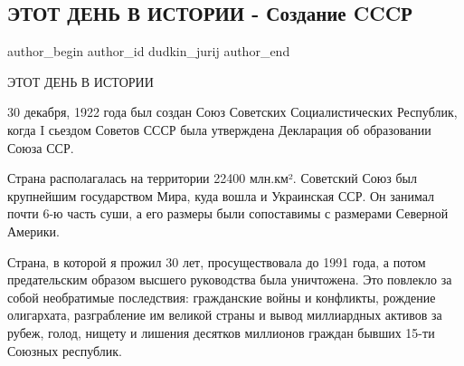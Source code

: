  
 
 
 
 
 
\subsection{ЭТОТ ДЕНЬ В ИСТОРИИ - Создание CCCР}
\label{sec:30_12_2021.fb.dudkin_jurij.1.sozdanie_sssr}
 
\ifcmt
 author_begin
   author_id dudkin_jurij
 author_end
\fi

ЭТОТ ДЕНЬ В ИСТОРИИ

30 декабря, 1922 года был создан Союз Советских Социалистических Республик,
когда I сьездом Советов СССР была утверждена Декларация об образовании Союза
ССР.


Страна располагалась на территории 22400 млн.км². Советский Союз был крупнейшим
государством Мира, куда вошла и Украинская ССР. Он занимал почти 6-ю часть
суши, а его размеры были сопоставимы с размерами Северной Америки.

Страна, в которой я прожил 30 лет, просуществовала до 1991 года, а потом
предательским образом высшего руководства была уничтожена. Это повлекло за
собой необратимые последствия: гражданские войны и конфликты, рождение
олигархата, разграбление им великой страны и вывод миллиардных активов за
рубеж, голод, нищету и лишения десятков миллионов граждан бывших 15-ти Союзных
республик.

